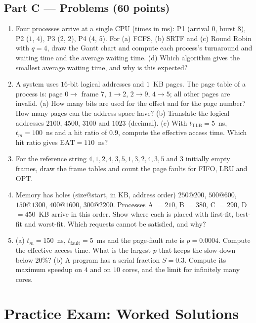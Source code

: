 \documentclass[11pt,a4paper]{article}
\begin{document}
\subsection*{Part C --- Problems \hfill (60 points)}
\begin{enumerate}[leftmargin=2.0em,label=C\arabic*.,itemsep=0.6em]
  \item {} Four processes arrive at a single CPU (times in ms): P1 (arrival $0$, burst $8$), P2 ($1$, $4$), P3 ($2$, $2$), P4 ($4$, $5$). For (a) FCFS, (b) SRTF and (c) Round Robin with $q = 4$, draw the Gantt chart and compute each process's turnaround and waiting time and the average waiting time. (d) Which algorithm gives the smallest average waiting time, and why is this expected?
  \item {} A system uses $16$-bit logical addresses and $1$~KB pages. The page table of a process is: page $0 \to$ frame $7$, $1 \to 2$, $2 \to 9$, $4 \to 5$; all other pages are invalid.
  (a) How many bits are used for the offset and for the page number? How many pages can the address space have?
  (b) Translate the logical addresses $2100$, $4500$, $3100$ and $1023$ (decimal).
  (c) With $t_{\text{TLB}} = 5$~ns, $t_m = 100$~ns and a hit ratio of $0.9$, compute the effective access time. Which hit ratio gives $\text{EAT} = 110$~ns?
  \item {} For the reference string $4, 1, 2, 4, 3, 5, 1, 3, 2, 4, 3, 5$ and $3$ initially empty frames, draw the frame tables and count the page faults for FIFO, LRU and OPT.
  \item {} Memory has holes (size@start, in KB, address order) $250@200$, $500@600$, $150@1300$, $400@1600$, $300@2200$. Processes A $=210$, B $=380$, C $=290$, D $=450$~KB arrive in this order. Show where each is placed with first-fit, best-fit and worst-fit. Which requests cannot be satisfied, and why?
  \item {} (a) $t_m = 150$~ns, $t_{\text{fault}} = 5$~ms and the page-fault rate is $p = 0.0004$. Compute the effective access time. What is the largest $p$ that keeps the slow-down below $20\%$?
  (b) A program has a serial fraction $S = 0.3$. Compute its maximum speedup on $4$ and on $10$ cores, and the limit for infinitely many cores.
\end{enumerate}

\section{Practice Exam: Worked Solutions}
\label{sec:solutions}
\end{document}
